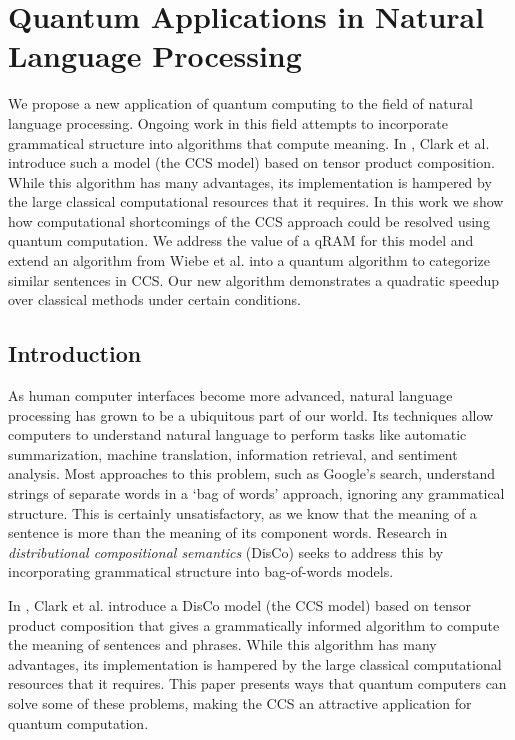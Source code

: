 \chapter{\color{blue} Quantum Applications in Natural Language Processing}
\label{chap:qDisCo}

\begin{chapabstract}
        We propose a new application of quantum computing to the field of natural language processing.  Ongoing work in this field attempts to incorporate grammatical structure into algorithms that compute meaning.  In \cite{clark2008compositional}, Clark et al. introduce such a model (the CCS model) based on tensor product composition. While this algorithm has many advantages, its implementation is hampered by the large classical computational resources that it requires. In this work we show how computational shortcomings of the  CCS approach could be resolved using quantum computation. We address the value of a qRAM \cite{giovannetti2008quantum} for this model and extend an algorithm from Wiebe et al. \cite{wiebe2014quantum} into a quantum algorithm to categorize similar sentences in CCS. Our new algorithm demonstrates a quadratic speedup over classical methods under certain conditions.
\end{chapabstract}

\section{Introduction}

As human computer interfaces become more advanced, natural language processing has grown to be a ubiquitous part of our world.  Its techniques allow computers to understand natural language to perform tasks like automatic summarization, machine translation, information retrieval, and sentiment analysis. Most approaches to this problem, such as Google's search, understand strings of separate words in a `bag of words' approach, ignoring any grammatical structure. This is certainly unsatisfactory, as we know that the meaning of a sentence is more than the meaning of its component words. Research in \textit{distributional compositional semantics} (DisCo) seeks to address this by incorporating grammatical structure into bag-of-words models. 

In \cite{clark2008compositional}, Clark et al. introduce a DisCo model (the CCS model) based on tensor product composition that gives a grammatically informed algorithm to compute the meaning of sentences and phrases. While this algorithm has many advantages, its implementation is hampered by the large classical computational resources that it requires.  This paper presents ways that quantum computers can solve some of these problems, making the CCS an attractive application for quantum computation.

